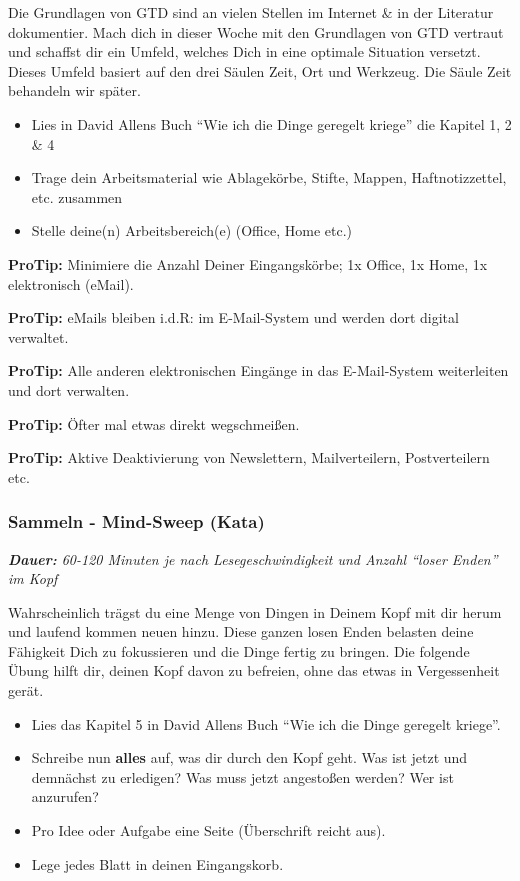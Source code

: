 \documentclass[
  ngerman,
  paper=a4,
,captions=tableheading
]{scrartcl}
\providecommand{\tightlist}{%
  \setlength{\itemsep}{0pt}\setlength{\parskip}{0pt}}
\begin{document}
Die Grundlagen von GTD sind an vielen Stellen im Internet \& in der
Literatur dokumentier. Mach dich in dieser Woche mit den Grundlagen von
GTD vertraut und schaffst dir ein Umfeld, welches Dich in eine optimale
Situation versetzt. Dieses Umfeld basiert auf den drei Säulen Zeit, Ort
und Werkzeug. Die Säule Zeit behandeln wir später.

\begin{itemize}
\tightlist
\item
  Lies in David Allens Buch ``Wie ich die Dinge geregelt kriege'' die
  Kapitel 1, 2 \& 4
\item
  Trage dein Arbeitsmaterial wie Ablagekörbe, Stifte, Mappen,
  Haftnotizzettel, etc. zusammen
\item
  Stelle deine(n) Arbeitsbereich(e) (Office, Home etc.)
\end{itemize}

\textbf{ProTip:} Minimiere die Anzahl Deiner Eingangskörbe; 1x Office,
1x Home, 1x elektronisch (eMail).

\textbf{ProTip:} eMails bleiben i.d.R: im E-Mail-System und werden dort
digital verwaltet.

\textbf{ProTip:} Alle anderen elektronischen Eingänge in das
E-Mail-System weiterleiten und dort verwalten.

\textbf{ProTip:} Öfter mal etwas direkt wegschmeißen.

\textbf{ProTip:} Aktive Deaktivierung von Newslettern, Mailverteilern,
Postverteilern etc.

\hypertarget{sammeln---mind-sweep-kata}{%
\subsubsection{Sammeln - Mind-Sweep
(Kata)}\label{sammeln---mind-sweep-kata}}

\emph{\textbf{Dauer:} 60-120 Minuten je nach Lesegeschwindigkeit und
Anzahl ``loser Enden'' im Kopf}

Wahrscheinlich trägst du eine Menge von Dingen in Deinem Kopf mit dir
herum und laufend kommen neuen hinzu. Diese ganzen losen Enden belasten
deine Fähigkeit Dich zu fokussieren und die Dinge fertig zu bringen. Die
folgende Übung hilft dir, deinen Kopf davon zu befreien, ohne das etwas
in Vergessenheit gerät.

\begin{itemize}
\tightlist
\item
  Lies das Kapitel 5 in David Allens Buch ``Wie ich die Dinge geregelt
  kriege''.
\item
  Schreibe nun \textbf{alles} auf, was dir durch den Kopf geht. Was ist
  jetzt und demnächst zu erledigen? Was muss jetzt angestoßen werden?
  Wer ist anzurufen?
\item
  Pro Idee oder Aufgabe eine Seite (Überschrift reicht aus).
\item
  Lege jedes Blatt in deinen Eingangskorb.
\end{itemize}
\end{document}
